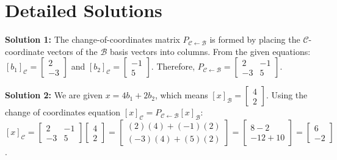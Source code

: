 \documentclass[11pt]{article}
\begin{document}
\newpage

\section{Detailed Solutions}

\textbf{Solution 1:} The change-of-coordinates matrix $P_{\mathcal{C} \leftarrow \mathcal{B}}$ is formed by placing the $\mathcal{C}$-coordinate vectors of the $\mathcal{B}$ basis vectors into columns. From the given equations:
$[b_1]_{\mathcal{C}} = \begin{bmatrix} 2 \\ -3 \end{bmatrix}$ and $[b_2]_{\mathcal{C}} = \begin{bmatrix} -1 \\ 5 \end{bmatrix}$.
Therefore, $P_{\mathcal{C} \leftarrow \mathcal{B}} = \begin{bmatrix} 2 & -1 \\ -3 & 5 \end{bmatrix}$.

\vspace{0.5cm}
\textbf{Solution 2:} We are given $x = 4b_1 + 2b_2$, which means $[x]_{\mathcal{B}} = \begin{bmatrix} 4 \\ 2 \end{bmatrix}$.
Using the change of coordinates equation $[x]_{\mathcal{C}} = P_{\mathcal{C} \leftarrow \mathcal{B}}[x]_{\mathcal{B}}$:
$[x]_{\mathcal{C}} = \begin{bmatrix} 2 & -1 \\ -3 & 5 \end{bmatrix} \begin{bmatrix} 4 \\ 2 \end{bmatrix} = \begin{bmatrix} (2)(4) + (-1)(2) \\ (-3)(4) + (5)(2) \end{bmatrix} = \begin{bmatrix} 8 - 2 \\ -12 + 10 \end{bmatrix} = \begin{bmatrix} 6 \\ -2 \end{bmatrix}$.
\end{document}
